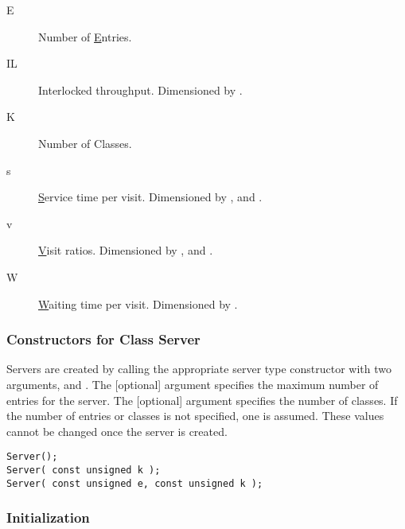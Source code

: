 \begin{description}
\item[E] \texonly{---} Number of \underline{E}ntries.
\item[IL] \texonly{---} Interlocked throughput.  Dimensioned by .
\item[K] \texonly{---} Number of Classes.
\item[s] \texonly{---} \underline{S}ervice time per visit.  Dimensioned by
  ,  and .
\item[v] \texonly{---} \underline{V}isit ratios. Dimensioned by
  ,  and .
\item[W] \texonly{---} \underline{W}aiting time per visit.  Dimensioned by .
\end{description}

\subsubsection{Constructors for Class Server}

Servers are created by calling the appropriate server type constructor
with two arguments,  and .  The [optional] 
argument specifies the maximum number of entries for the server.  The
[optional]  argument specifies the number of classes.  If the
number of entries or classes is not specified, one is assumed.  These
values cannot be changed once the server is created.

\begin{verbatim}
Server();
Server( const unsigned k );
Server( const unsigned e, const unsigned k );
\end{verbatim}


\subsubsection{Initialization}
\label{sec:server-initialization}

